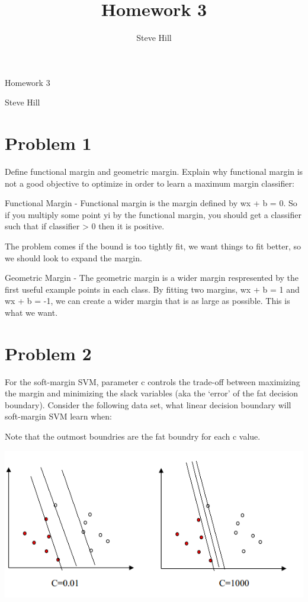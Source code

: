 \documentclass{article}
\title{Homework 3}
\author{Steve Hill}
\begin{document}
\vspace*{-1in}
\huge
\begin{center}
Homework 3

Steve Hill
\end{center}
\normalsize

\section{Problem 1}
Define functional margin and geometric margin. Explain why functional margin is not a 
good objective to optimize in order to learn a maximum margin classifier:


Functional Margin - Functional margin is the margin defined by wx + b = 0.
So if you multiply some point yi by the functional margin, you should get a
classifier such that if classifier > 0 then it is positive.


The problem comes if the bound is too tightly fit, we want things to fit better,
so we should look to expand the margin.


Geometric Margin - The geometric margin is a wider margin respresented by the
first useful example points in each class. By fitting two margins, wx + b = 1
and wx + b = -1, we can create a wider margin that is as large as possible.
This is what we want.

\section{Problem 2}
For the soft-margin SVM, parameter c controls the trade-off between maximizing the 
margin and minimizing the slack variables (aka the ‘error’ of the fat decision boundary). 
Consider the following data set, what linear decision boundary will soft-margin SVM 
learn when:\newline

\noindent
Note that the outmost boundries are the fat boundry for each c value.
\begin{center}
\includegraphics[scale = .6]{SVMex.png}
\end{center}
\end{document}
